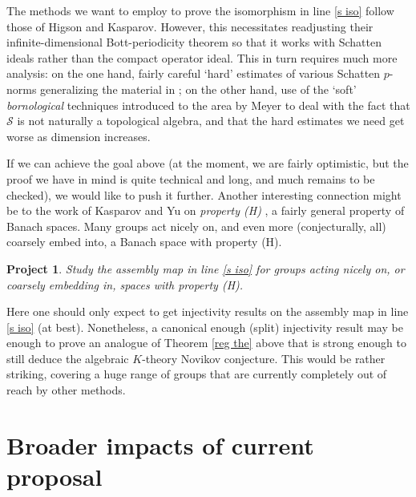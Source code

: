 \documentclass[11pt]{article}
\theoremstyle{plain}
\newtheorem{project}[theorem]{Project}
\theoremstyle{definition}
\theoremstyle{remark}
\begin{document}
The methods we want to employ to prove the isomorphism in line \eqref{s iso} follow those of Higson and Kasparov.  However, this necessitates readjusting their infinite-dimensional Bott-periodicity theorem \cite{Higson:1999be} so that it works with Schatten ideals rather than the compact operator ideal.  This in turn requires much more analysis: on the one hand, fairly careful `hard' estimates of various Schatten $p$-norms generalizing the material in \cite[Chapter 4]{Simon:2005aa}; on the other hand, use of the `soft' \emph{bornological} techniques introduced to the area by Meyer \cite{Meyer:2007aa} to deal with the fact that $\mathcal{S}$ is not naturally a topological algebra, and that the hard estimates we need get worse as dimension increases.

If we can achieve the goal above (at the moment, we are fairly optimistic, but the proof we have in mind is quite technical and long, and much remains to be checked), we would like to push it further.  Another interesting connection might be to the work of Kasparov and Yu on \emph{property (H)} \cite{Kasparov:2009jt}, a fairly general property of Banach spaces.  Many groups act nicely on, and even more (conjecturally, all) coarsely embed into, a Banach space with property (H).

\begin{project}
Study the assembly map in line \eqref{s iso} for groups acting nicely on, or coarsely embedding in, spaces with property (H).
\end{project}

Here one should only expect to get injectivity results on the assembly map in line \eqref{s iso} (at best).  Nonetheless, a canonical enough (split) injectivity result may be enough to prove an analogue of Theorem \ref{reg the} above that is strong enough to still deduce the algebraic $K$-theory Novikov conjecture.  This would be rather striking, covering a huge range of groups that are currently completely out of reach by other methods.











 
 
 \section{Broader impacts of current proposal}
 
\end{document}
